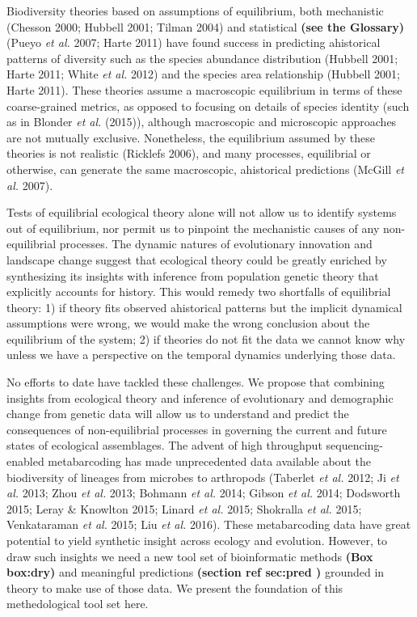 \documentclass[
]{article}
\begin{document}
Biodiversity theories based on assumptions of equilibrium, both
mechanistic (Chesson 2000; Hubbell 2001; Tilman 2004) and statistical
\textbf{(see the Glossary)} (Pueyo \emph{et al.} 2007; Harte 2011) have
found success in predicting ahistorical patterns of diversity such as
the species abundance distribution (Hubbell 2001; Harte 2011; White
\emph{et al.} 2012) and the species area relationship (Hubbell 2001;
Harte 2011). These theories assume a macroscopic equilibrium in terms of
these coarse-grained metrics, as opposed to focusing on details of
species identity (such as in Blonder \emph{et al.} (2015)), although
macroscopic and microscopic approaches are not mutually exclusive.
Nonetheless, the equilibrium assumed by these theories is not realistic
(Ricklefs 2006), and many processes, equilibrial or otherwise, can
generate the same macroscopic, ahistorical predictions (McGill \emph{et
al.} 2007).

Tests of equilibrial ecological theory alone will not allow us to
identify systems out of equilibrium, nor permit us to pinpoint the
mechanistic causes of any non-equilibrial processes. The dynamic natures
of evolutionary innovation and landscape change suggest that ecological
theory could be greatly enriched by synthesizing its insights with
inference from population genetic theory that explicitly accounts for
history. This would remedy two shortfalls of equilibrial theory: 1) if
theory fits observed ahistorical patterns but the implicit dynamical
assumptions were wrong, we would make the wrong conclusion about the
equilibrium of the system; 2) if theories do not fit the data we cannot
know why unless we have a perspective on the temporal dynamics
underlying those data.

No efforts to date have tackled these challenges. We propose that
combining insights from ecological theory and inference of evolutionary
and demographic change from genetic data will allow us to understand and
predict the consequences of non-equilibrial processes in governing the
current and future states of ecological assemblages. The advent of high
throughput sequencing-enabled metabarcoding has made unprecedented data
available about the biodiversity of lineages from microbes to arthropods
(Taberlet \emph{et al.} 2012; Ji \emph{et al.} 2013; Zhou \emph{et al.}
2013; Bohmann \emph{et al.} 2014; Gibson \emph{et al.} 2014; Dodsworth
2015; Leray \& Knowlton 2015; Linard \emph{et al.} 2015; Shokralla
\emph{et al.} 2015; Venkataraman \emph{et al.} 2015; Liu \emph{et al.}
2016). These metabarcoding data have great potential to yield synthetic
insight across ecology and evolution. However, to draw such insights we
need a new tool set of bioinformatic methods \textbf{(Box box:dry)} and
meaningful predictions \textbf{(section ref sec:pred )} grounded in
theory to make use of those data. We present the foundation of this
methedological tool set here.
\end{document}
